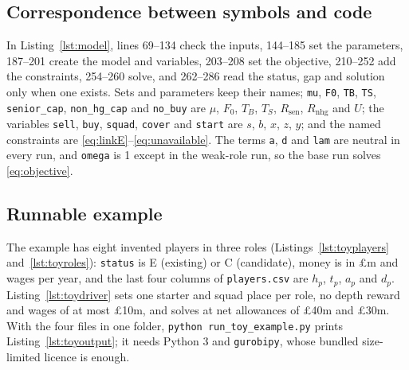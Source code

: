\subsection{Correspondence between symbols and code}

In Listing~\ref{lst:model}, lines 69--134 check the inputs, 144--185 set the parameters, 187--201 create the model and variables, 203--208 set the objective, 210--252 add the constraints, 254--260 solve, and 262--286 read the status, gap and solution only when one exists. Sets and parameters keep their names; \texttt{mu}, \texttt{F0}, \texttt{TB}, \texttt{TS}, \texttt{senior\_cap}, \texttt{non\_hg\_cap} and \texttt{no\_buy} are $\mu$, $F_0$, $T_B$, $T_S$, $R_{\mathrm{sen}}$, $R_{\mathrm{nhg}}$ and $U$; the variables \texttt{sell}, \texttt{buy}, \texttt{squad}, \texttt{cover} and \texttt{start} are $s$, $b$, $x$, $z$, $y$; and the named constraints are \eqref{eq:linkE}--\eqref{eq:unavailable}. The terms \texttt{a}, \texttt{d} and \texttt{lam} are neutral in every run, and \texttt{omega} is 1 except in the weak-role run, so the base run solves \eqref{eq:objective}.

\subsection{Runnable example}\label{app:example}

The example has eight invented players in three roles (Listings~\ref{lst:toyplayers} and~\ref{lst:toyroles}): \texttt{status} is E (existing) or C (candidate), money is in \pounds m and wages per year, and the last four columns of \texttt{players.csv} are $h_p$, $t_p$, $a_p$ and $d_p$. Listing~\ref{lst:toydriver} sets one starter and squad place per role, no depth reward and wages of at most \pounds 10m, and solves at net allowances of \pounds 40m and \pounds 30m. With the four files in one folder, \texttt{python run\_toy\_example.py} prints Listing~\ref{lst:toyoutput}; it needs Python 3 and \texttt{gurobipy}, whose bundled size-limited licence is enough.

\begin{singlespace}




\end{singlespace}

